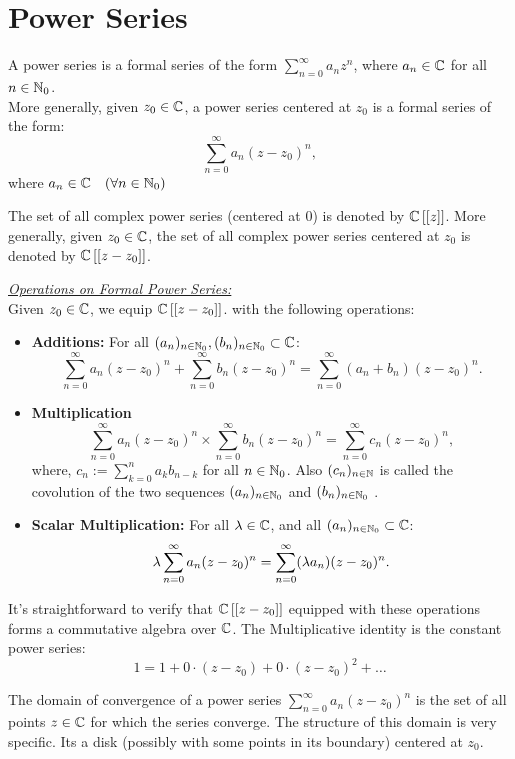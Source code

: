 \chapter{Power Series}

\begin{definition}
  A power series is a formal series of the form 
  $\sum_{n=0}^{\infty} a_{n}z^{n} $, where $a_{n} \in  \mathbb{C} $ for all
  $n \in \mathbb{N}_0$. \\
  More generally, given $z_0 \in \mathbb{C}  $, a power series 
  centered at  $z_0 $ is a formal series of the form: 
  \[
  \sum_{n=0}^{\infty} a_{n}(z-z_0) ^{n},
  \]
  where $a_{n} \in \mathbb{C}  \quad (\forall n \in \mathbb{N}_0)  $ 
\end{definition}
\begin{remark}
  The set of all complex power series 
  (centered at $0 $) is denoted by 
  $\mathbb{C} \left[ [z] \right] $. More generally, given
  $z_0 \in  \mathbb{C}  $, the set of all complex power series centered
  at $z_0 $ is denoted by $\mathbb{C} 
  \left[ [z-z_0] \right]
  $. 
\end{remark}
\noindent  \textcolor{larratBicep!10!brown}{
  \uline{
\large\emph{  Operations on Formal Power Series:}
  }
}\\
Given $z_0 \in  \mathbb{C}  $, we equip $\mathbb{C} \left[ \left[ z-z_0 \right] \right] $.
with the following operations: 
\begin{itemize}
  \item[\ding{172}]\textbf{Additions:} For all $(a_{n}) _{n \in \mathbb{N}_0}, (b_{n}) _{n \in \mathbb{N}_0} \subset   \mathbb{C}$:
  \[
  \sum_{n=0}^{\infty} a_{n}(z-z_0) ^n + \sum_{n=0}^{\infty} b_{n}(z-z_0) ^n = 
  \sum_{n=0}^{\infty} (a_{n} + b_n ) (z-z_0) ^n.
  \]
\item[\ding{173}]\textbf{Multiplication} 
  \[
  \sum_{n=0}^{\infty} a_{n}(z-z_0) ^n  \times \sum_{n=0}^{\infty} 
  b_n (z-z_0) ^n = 
  \sum_{n=0}^{\infty} c_{n} (z-z_0) ^n,
  \]
  where, $c _n := \sum_{k=0}^{n} a_{k} b_{n-k} $  for all $n \in \mathbb{N}_0 $.
  Also $(c_{n}) _{n \in \mathbb{N}} $ is called the covolution of the two sequences
  $(a_{n}) _{n \in \mathbb{N}_0} $ and $(b_{n}) _{n \in \mathbb{N}_0} $ .
\item[\ding{174}]
   \textbf{Scalar Multiplication:} For all $\lambda \in  \mathbb{C}  $, and all $(a_{n}) _{n \in \mathbb{N}_0} \subset   \mathbb{C}  $:
   \begin{align*}
   \lambda \sum_{n=0}^{\infty} a_{n}(z-z_0) ^n  = 
   \sum_{n=0}^{\infty} (\lambda a _n ) (z-z_0) ^n.
   \end{align*}
\end{itemize}
It's straightforward to verify that $\mathbb{C} \left[ \left[ z-z_0 \right] \right] $  equipped with these operations 
forms a commutative algebra over $\mathbb{C}  $. The Multiplicative identity is the constant power series:
\[
1 = 1 + 0 \cdot ( z-z_0)  + 0 \cdot (z-z_0) ^2 + \hdots 
\]
\begin{definition}
The domain of convergence of a power series 
$\sum_{n=0}^{\infty} a_n (z-z_0) ^n  $ is the set of all points $z \in  \mathbb{C}  $ for which 
the series converge. The structure of this domain is very specific. Its a disk (possibly with 
some points in its boundary) centered at $z_0$.
\end{definition}

